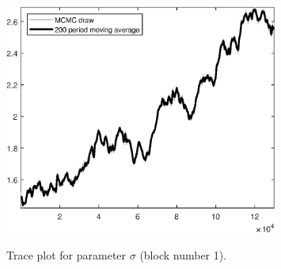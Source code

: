 \begin{figure}[H]
\centering
  \includegraphics[width=0.8\textwidth]{BRS_sectoral_wo_fixed_cost/graphs/TracePlot_sigma_blck_1}\\
    \caption{Trace plot for parameter ${\sigma}$ (block number 1).}
\end{figure}

